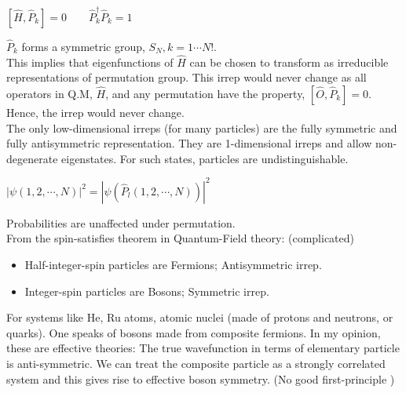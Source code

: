 \documentclass[a4paper, 12pt]{article}
\begin{document}
\begin{summary}{}{}
\begin{center}
	$\left[ \hat{H},\hat{P}_k \right]=0 \qquad \hat{P}_k^\dagger \hat{P}_k=1$
\end{center} 
\tab $\hat{P}_k$ forms a symmetric group, $S_N, k=1\cdots N!$.\\
\tab This implies that eigenfunctions of $\hat{H}$ can be chosen to transform as irreducible representations of permutation group. This irrep would never change as all operators in Q.M, $\hat{H}$, and any permutation have the property, $\left[ \hat{O},\hat{P}_k\right]=0$. Hence, the irrep would never change.\\
\tab The only low-dimensional irreps (for many particles) are the fully symmetric and fully antisymmetric representation. They are 1-dimensional irreps and allow non-degenerate eigenstates. For such states, particles are undistinguishable. 
\begin{center}
	$|\psi(1,2,\cdots,N ) |^2=|\psi(\hat{P}_l(1,2,\cdots,N )) |^2$
\end{center}
\tab Probabilities are unaffected under permutation.\\
\tab From the spin-satisfies theorem in Quantum-Field theory: (complicated)
\begin{itemize}
	\item Half-integer-spin particles are Fermions; Antisymmetric irrep.
	\item Integer-spin particles are Bosons; Symmetric irrep.
\end{itemize}
\tab For systems like He, Ru atoms, atomic nuclei (made of protons and neutrons, or quarks). One speaks of bosons made from composite fermions. In my opinion, these are effective theories: The true wavefunction in terms of elementary particle is anti-symmetric. We can treat the composite particle as a strongly correlated system and this gives rise to effective boson symmetry. (No good first-principle )
\end{summary}
\end{document}
